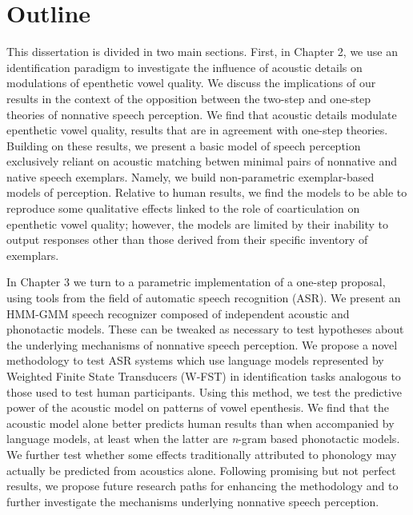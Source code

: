 \section{Outline}
This dissertation is divided in two main sections. First, in Chapter 2, we use an identification paradigm to investigate the influence of acoustic details on modulations of epenthetic vowel quality. We discuss the implications of our results in the context of the opposition between the two-step and one-step theories of nonnative speech perception. We find that acoustic details modulate epenthetic vowel quality, results that are in agreement with one-step theories. Building on these results, we present a basic model of speech perception exclusively reliant on acoustic matching betwen minimal pairs of nonnative and native speech exemplars. Namely, we build non-parametric exemplar-based models of perception. Relative to human results, we find the models to be able to reproduce some qualitative effects linked to the role of coarticulation on epenthetic vowel quality; however, the models are limited by their inability to output responses other than those derived from their specific inventory of exemplars.

In Chapter 3 we turn to a parametric implementation of a one-step proposal, using tools from the field of automatic speech recognition (ASR). We present an HMM-GMM speech recognizer composed of independent acoustic and phonotactic models. These can be tweaked as necessary to test hypotheses about the underlying mechanisms of nonnative speech perception. We propose a novel methodology to test ASR systems which use language models represented by Weighted Finite State Transducers (W-FST) in identification tasks analogous to those used to test human participants. Using this method, we test the predictive power of the acoustic model on patterns of vowel epenthesis. We find that the acoustic model alone better predicts human results than when accompanied by language models, at least when the latter are \textit{n}-gram based phonotactic models. We further test whether some effects traditionally attributed to phonology may actually be predicted from acoustics alone. Following promising but not perfect results, we propose future research paths for enhancing the methodology and to further investigate the mechanisms underlying nonnative speech perception.  